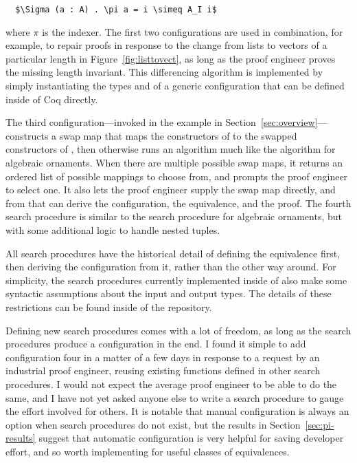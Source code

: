 \begin{lstlisting}
  $\Sigma (a : A) . \pi a = i \simeq A_I i$
\end{lstlisting}
where $\pi$ is the indexer.
The first two configurations are used in combination, for example,
to repair proofs in response to the change from lists to vectors of a particular length in Figure~\ref{fig:listtovect},
as long as the proof engineer proves the missing length invariant.
This differencing algorithm is implemented by simply instantiating the types \Aa and \B of a generic 
configuration that can be defined inside of Coq directly.

The third configuration---invoked in the example in Section~\ref{sec:overview}---constructs a swap map
that maps the constructors of \Aa to the swapped constructors of \B, then otherwise runs an algorithm much like
the algorithm for algebraic ornaments.
When there are multiple possible swap maps, it returns an ordered list of possible mappings to choose from,
and prompts the proof engineer to select one. %
It also lets the proof engineer supply the swap map directly, and from that can derive the configuration, the equivalence, and the proof.
The fourth search procedure is similar to the search procedure for algebraic ornaments, but with some additional logic
to handle nested tuples.

All search procedures have the historical detail of defining the equivalence first, then deriving the configuration from it,
rather than the other way around.
For simplicity, the search procedures currently implemented inside of \toolnamec also make some syntactic assumptions
about the input and output types.
The details of these restrictions can be found inside of the repository. %

Defining new search procedures comes with a lot of freedom, as long as the search procedures produce a configuration in the end.
I found it simple to add configuration four in a matter of a few days in response to a request by an industrial proof engineer,
reusing existing functions defined in other search procedures.
I would not expect the average proof engineer to be able to do the same, and I have not yet asked anyone else to write a search procedure
to gauge the effort involved for others.
It is notable that manual configuration is always an option when search procedures do not exist,
but the results in Section~\ref{sec:pi-results} suggest that automatic configuration is very helpful for saving developer effort,
and so worth implementing for useful classes of equivalences.

